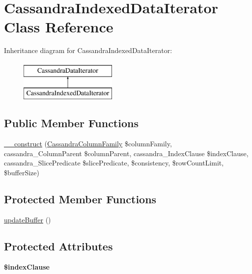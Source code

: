 \hypertarget{classCassandraIndexedDataIterator}{
\section{CassandraIndexedDataIterator Class Reference}
\label{classCassandraIndexedDataIterator}
}
Inheritance diagram for CassandraIndexedDataIterator:\begin{figure}[H]
\begin{center}
\leavevmode
\includegraphics[height=2.000000cm]{classCassandraIndexedDataIterator}
\end{center}
\end{figure}
\subsection*{Public Member Functions}
\begin{DoxyCompactItemize}
\item 
\hyperlink{classCassandraIndexedDataIterator_a489fdf163525dd1bd4cf99b4e81708f3}{\_\-\_\-construct} (\hyperlink{classCassandraColumnFamily}{CassandraColumnFamily} \$columnFamily, cassandra\_\-ColumnParent \$columnParent, cassandra\_\-IndexClause \$indexClause, cassandra\_\-SlicePredicate \$slicePredicate, \$consistency, \$rowCountLimit, \$bufferSize)
\end{DoxyCompactItemize}
\subsection*{Protected Member Functions}
\begin{DoxyCompactItemize}
\item 
\hyperlink{classCassandraIndexedDataIterator_a1d38641286c86458941bca203d6fea65}{updateBuffer} ()
\end{DoxyCompactItemize}
\subsection*{Protected Attributes}
\begin{DoxyCompactItemize}
\item 
\hypertarget{classCassandraIndexedDataIterator_a21fda6e85a7d5d7dda9da9edf26be514}{
{\bfseries \$indexClause}}
\label{classCassandraIndexedDataIterator_a21fda6e85a7d5d7dda9da9edf26be514}

\end{DoxyCompactItemize}


